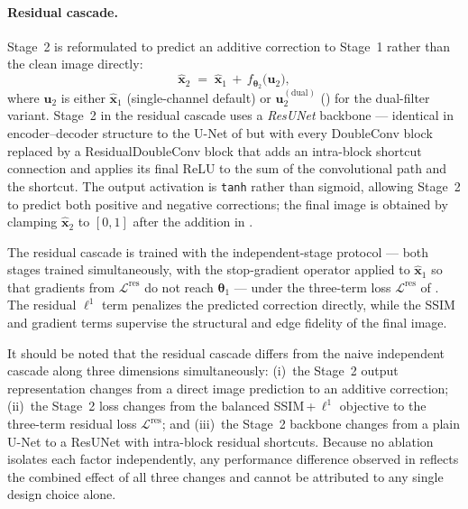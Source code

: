 \paragraph{Residual cascade.}
Stage~2 is reformulated to predict an additive correction to Stage~1 rather than the clean image directly:
\begin{equation}
    \hat{\mathbf{x}}_{2} \;=\; \hat{\mathbf{x}}_{1}
        \,+\, f_{\boldsymbol{\theta}_{2}}\!\bigl(\mathbf{u}_2\bigr),
    \label{eq:meth_residual}
\end{equation}
where $\mathbf{u}_2$ is either $\hat{\mathbf{x}}_1$ (single-channel default) or $\mathbf{u}_2^{(\mathrm{dual})}$ () for the dual-filter variant. Stage~2 in the residual cascade uses a \emph{ResUNet} backbone --- identical in encoder--decoder structure to the U-Net of  but with every DoubleConv block replaced by a ResidualDoubleConv block that adds an intra-block shortcut connection and applies its final ReLU to the sum of the convolutional path and the shortcut. The output activation is \texttt{tanh} rather than sigmoid, allowing Stage~2 to predict both positive and negative corrections; the final image is obtained by clamping $\hat{\mathbf{x}}_2$ to $[0,1]$ after the addition in .

The residual cascade is trained with the independent-stage protocol ---
both stages trained simultaneously, with the stop-gradient operator applied to
$\hat{\mathbf{x}}_{1}$ so that gradients from $\mathcal{L}^{\mathrm{res}}$ do not reach
$\boldsymbol{\theta}_1$ --- under the three-term loss
$\mathcal{L}^{\mathrm{res}}$ of . The residual $\ell^{1}$ term penalizes
the predicted correction directly, while the SSIM and gradient terms supervise the structural and
edge fidelity of the final image.

It should be noted that the residual cascade differs from the naive independent cascade along three dimensions simultaneously: (i)~the Stage~2 output representation changes from a direct image prediction to an additive correction; (ii)~the Stage~2 loss changes from the balanced SSIM\,+\,$\ell^{1}$ objective to the three-term residual loss $\mathcal{L}^{\mathrm{res}}$; and (iii)~the Stage~2 backbone changes from a plain U-Net to a ResUNet with intra-block residual shortcuts. Because no ablation isolates each factor independently, any performance difference observed in  reflects the combined effect of all three changes and cannot be attributed to any single design choice alone.



